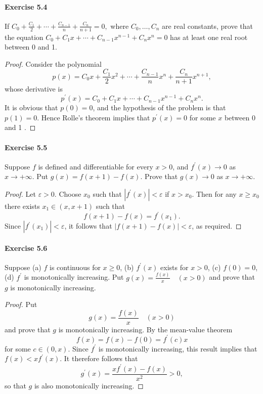 \documentclass{article}
\theoremstyle{definition}
\begin{document}
\paragraph{Exercise 5.4} If $C_{0}+\frac{C_{1}}{2}+\cdots+\frac{C_{n-1}}{n}+\frac{C_{n}}{n+1}=0,$ where $C_{0}, \ldots, C_{n}$ are real constants, prove that the equation $C_{0}+C_{1} x+\cdots+C_{n-1} x^{n-1}+C_{n} x^{n}=0$ has at least one real root between 0 and 1.
\begin{proof}
    Consider the polynomial
$$
p(x)=C_0 x+\frac{C_1}{2} x^2+\cdots+\frac{C_{n-1}}{n} x^n+\frac{C_n}{n+1} x^{n+1},
$$
whose derivative is
$$
p^{\prime}(x)=C_0+C_1 x+\cdots+C_{n-1} x^{n-1}+C_n x^n .
$$
It is obvious that $p(0)=0$, and the hypothesis of the problem is that $p(1)=0$. Hence Rolle's theorem implies that $p^{\prime}(x)=0$ for some $x$ between 0 and 1 .
\end{proof}



\paragraph{Exercise 5.5} Suppose $f$ is defined and differentiable for every $x>0$, and $f^{\prime}(x) \rightarrow 0$ as $x \rightarrow+\infty$. Put $g(x)=f(x+1)-f(x)$. Prove that $g(x) \rightarrow 0$ as $x \rightarrow+\infty$.
\begin{proof}
    Let $\varepsilon>0$. Choose $x_0$ such that $\left|f^{\prime}(x)\right|<\varepsilon$ if $x>x_0$. Then for any $x \geq x_0$ there exists $x_1 \in(x, x+1)$ such that
$$
f(x+1)-f(x)=f^{\prime}\left(x_1\right) .
$$
Since $\left|f^{\prime}\left(x_1\right)\right|<\varepsilon$, it follows that $|f(x+1)-f(x)|<\varepsilon$, as required.
\end{proof}



\paragraph{Exercise 5.6} Suppose (a) $f$ is continuous for $x \geq 0$, (b) $f^{\prime}(x)$ exists for $x>0$, (c) $f(0)=0$, (d) $f^{\prime}$ is monotonically increasing. Put $g(x)=\frac{f(x)}{x} \quad(x>0)$ and prove that $g$ is monotonically increasing.
\begin{proof}
    Put
$$
g(x)=\frac{f(x)}{x} \quad(x>0)
$$
and prove that $g$ is monotonically increasing.
By the mean-value theorem
$$
f(x)=f(x)-f(0)=f^{\prime}(c) x
$$
for some $c \in(0, x)$. Since $f^{\prime}$ is monotonically increasing, this result implies that $f(x)<x f^{\prime}(x)$. It therefore follows that
$$
g^{\prime}(x)=\frac{x f^{\prime}(x)-f(x)}{x^2}>0,
$$
so that $g$ is also monotonically increasing.
\end{proof}
\end{document}
